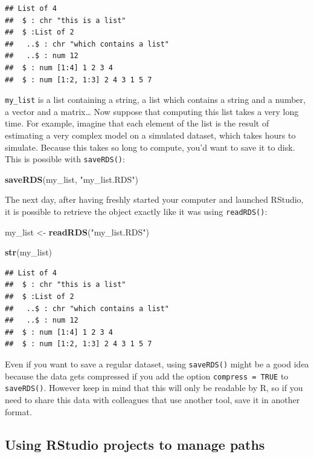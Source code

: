\documentclass[]{gitbook}
\newenvironment{Shaded}{\begin{snugshade}}{\end{snugshade}}
\newcommand{\KeywordTok}[1]{\textcolor[rgb]{0.13,0.29,0.53}{\textbf{#1}}}
\newcommand{\NormalTok}[1]{#1}
\newcommand{\StringTok}[1]{\textcolor[rgb]{0.31,0.60,0.02}{#1}}
\begin{document}
\begin{verbatim}
## List of 4
##  $ : chr "this is a list"
##  $ :List of 2
##   ..$ : chr "which contains a list"
##   ..$ : num 12
##  $ : num [1:4] 1 2 3 4
##  $ : num [1:2, 1:3] 2 4 3 1 5 7
\end{verbatim}

\texttt{my\_list} is a list containing a string, a list which contains a string and a number, a vector and
a matrix\ldots{} Now suppose that computing this list takes a very long time. For example, imagine that
each element of the list is the result of estimating a very complex model on a simulated
dataset, which takes hours to simulate. Because this takes so long to compute, you'd want to save
it to disk. This is possible with \texttt{saveRDS()}:

\begin{Shaded}
\begin{Highlighting}[]
\KeywordTok{saveRDS}\NormalTok{(my_list, }\StringTok{"my_list.RDS"}\NormalTok{)}
\end{Highlighting}
\end{Shaded}

The next day, after having freshly started your computer and launched RStudio, it is possible to
retrieve the object exactly like it was using \texttt{readRDS()}:

\begin{Shaded}
\begin{Highlighting}[]
\NormalTok{my_list <-}\StringTok{ }\KeywordTok{readRDS}\NormalTok{(}\StringTok{"my_list.RDS"}\NormalTok{)}

\KeywordTok{str}\NormalTok{(my_list)}
\end{Highlighting}
\end{Shaded}

\begin{verbatim}
## List of 4
##  $ : chr "this is a list"
##  $ :List of 2
##   ..$ : chr "which contains a list"
##   ..$ : num 12
##  $ : num [1:4] 1 2 3 4
##  $ : num [1:2, 1:3] 2 4 3 1 5 7
\end{verbatim}

Even if you want to save a regular dataset, using \texttt{saveRDS()} might be a good idea because the data
gets compressed if you add the option \texttt{compress\ =\ TRUE} to \texttt{saveRDS()}. However keep in mind that
this will only be readable by R, so if you need to share this data with colleagues that use another
tool, save it in another format.

\hypertarget{using-rstudio-projects-to-manage-paths}{%
\subsection{Using RStudio projects to manage paths}\label{using-rstudio-projects-to-manage-paths}}
\end{document}
